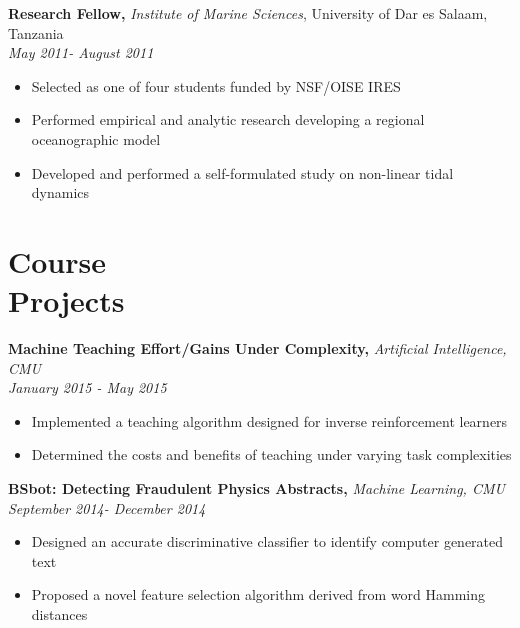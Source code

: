 \documentclass[margin]{res}
\begin{document}
\begin{resume}
{\bf Research Fellow,} \textit{Institute of Marine Sciences}, University of Dar es Salaam, Tanzania\\
\emph{May 2011- August 2011}
\begin{itemize} \itemsep -2pt
\item Selected as one of four students funded by NSF/OISE IRES
                 \item Performed empirical and analytic research developing a regional oceanographic model
                 \item Developed and performed a self-formulated study on non-linear tidal dynamics
 \end{itemize}


 \section{Course \\ Projects}
        	{\bf Machine Teaching Effort/Gains Under Complexity,} \emph{Artificial Intelligence, CMU}\\ \hfill
        	\emph{January 2015 - May 2015}
        	\begin{itemize} \itemsep -2pt
        		\item Implemented a teaching algorithm designed for inverse reinforcement learners
        		\item Determined the costs and benefits of teaching under varying task complexities
        	\end{itemize}
        	\vspace{-10pt}

        	{\bf BSbot: Detecting Fraudulent Physics Abstracts,} \emph{Machine Learning, CMU}\\ \hfill   		\emph{September 2014- December 2014}
                \begin{itemize} \itemsep -2pt
                 \item Designed an accurate discriminative classifier to identify computer generated text
                 \item Proposed a novel feature selection algorithm derived from word Hamming distances
        	 \end{itemize}
            \vspace{-10pt}


            \end{resume}
\end{document}
